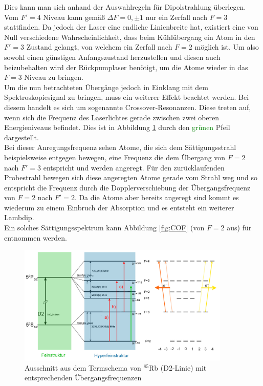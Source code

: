 \documentclass[
class=book,
accentcolor=1b,
custommargins=geometry,
fontsize=11pt,
thesis={type=Versuchsanleitung},
ruledheaders=all,
headline=false,
instbox=false,
marginpar=false,
title=small,
ignore-missing-data=true,
twoside=false,
logofile=apqdesign/tuda_logo.pdf,
pdfa=false %
]{apqpub}
\newcommand{\gqq}[1]{\glqq{}#1\grqq{}}
\begin{document}
					Dies kann man sich anhand der Auswahlregeln für Dipolstrahlung überlegen. 
					Vom $F'=4$ Niveau kann gemäß $\varDelta F=0,\pm1$ nur ein Zerfall nach $F=3$ stattfinden. Da jedoch der Laser eine endliche Linienbreite hat, existiert eine von Null verschiedene Wahrscheinlichkeit, dass beim Kühlübergang ein Atom in den $F'=3$ Zustand gelangt, von welchem ein Zerfall nach $F=2$ möglich ist. 
					Um also sowohl einen günstigen Anfangszustand herzustellen und diesen auch beizubehalten wird der Rückpumplaser benötigt, um die Atome wieder in das $F=3$ Niveau zu bringen.\\
					Um die nun betrachteten Übergänge jedoch in Einklang mit dem Spektroskopiesignal zu bringen, muss ein weiterer Effekt beachtet werden. 
					Bei diesem handelt es sich um sogenannte Crossover-Resonanzen. Diese treten auf, wenn sich die Frequenz des Laserlichtes gerade zwischen zwei oberen Energieniveaus befindet. 
					Dies ist in Abbildung \ref{fig:TS} durch den \textcolor{green}{grünen} Pfeil dargestellt.\\
					Bei dieser Anregungsfrequenz \gqq{sehen} Atome, die sich dem Sättigungsstrahl beispielsweise entgegen bewegen, eine Frequenz die dem Übergang  von $F=2$ nach $F'=3$ entspricht und werden angeregt. 
					Für den zurücklaufenden Probestrahl bewegen sich diese angeregten Atome gerade vom Strahl weg und so entspricht die Frequenz durch die Dopplerverschiebung der Übergangsfrequenz von $F=2$ nach $F'=2$. 
					Da die Atome aber bereits angeregt sind kommt es wiederum zu einem Einbruch der Absorption und es entsteht ein weiterer Lambdip.\\
					Ein solches Sättigungsspektrum kann Abbildung \ref{fig:COF} (von $F=2$ aus) für  entnommen werden.\\ 									
					\begin{figure}[htb!]
						\centering
						\includegraphics[width = 0.9\textwidth]{graphics/TS_korrigiert.jpg}
						\caption{Ausschnitt aus dem Termschema von $^{85}$Rb (D2-Linie) mit entsprechenden Übergangsfrequenzen}
						\label{fig:TS}
					\end{figure}
\end{document}
